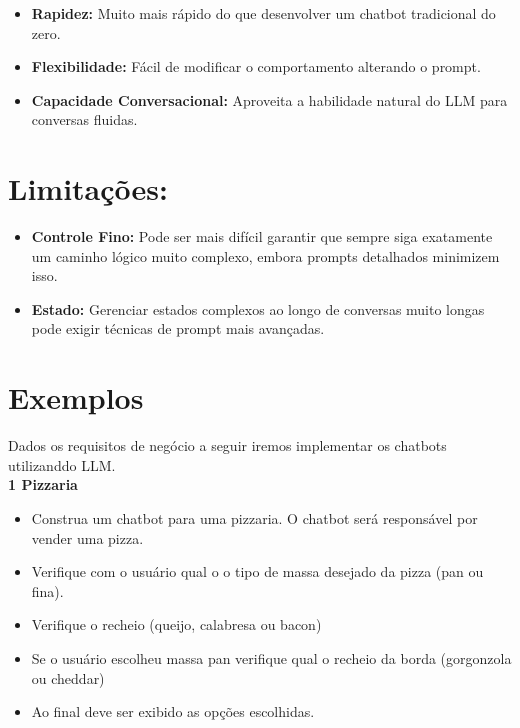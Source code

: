 \documentclass[14pt,a4paper,oneside]{book}
\begin{document}
\begin{itemize}
    \item \textbf{Rapidez:} Muito mais rápido do que desenvolver um chatbot tradicional do zero.
    \item \textbf{Flexibilidade:} Fácil de modificar o comportamento alterando o prompt.
    \item \textbf{Capacidade Conversacional:} Aproveita a habilidade natural do LLM para conversas fluidas.
\end{itemize}

\section*{Limitações:}

\begin{itemize}
    \item \textbf{Controle Fino:} Pode ser mais difícil garantir que sempre siga exatamente um caminho lógico muito complexo, embora prompts detalhados minimizem isso.
    \item \textbf{Estado:} Gerenciar estados complexos ao longo de conversas muito longas pode exigir técnicas de prompt mais avançadas.
\end{itemize}

\section*{Exemplos}

Dados os requisitos de negócio a seguir iremos implementar os chatbots utilizanddo LLM. \\

\textbf{1 Pizzaria} \\

\begin{itemize}[nosep]
	\item Construa um chatbot para uma pizzaria. O chatbot será responsável por vender uma pizza.
	\item Verifique com o usuário qual o o tipo de massa desejado da pizza (pan ou fina).
	\item Verifique o recheio (queijo, calabresa ou bacon)
	\item Se o usuário escolheu massa pan verifique qual o recheio da borda (gorgonzola ou cheddar)
	\item Ao final deve ser exibido as opções escolhidas.
\end{itemize} 

\vspace{\baselineskip}
\end{document}
